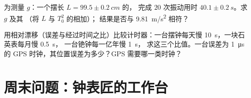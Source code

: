 \begin{exercise}[$\star\star\star$]\label{exo:g12:oscillators-and-time:14}
为测量 $g$：一个摆长 $L = 99.5 \pm \qty{0.2}{cm}$ 的，
完成 $20$ 次振动用时 $40.1 \pm \qty{0.2}{s}$。求 $g$ 及其
（将 $L$ 与 $T_0^2$ 的相加）；
结果是否与 \qty{9.81}{m/s^2} 相符？
\end{exercise}

\begin{exercise}[$\star\star\star$]\label{exo:g12:oscillators-and-time:15}
用相对漂移（误差与经过时间之比）比较计时器：一台摆钟每天慢
\qty{10}{s}，一块石英表每月慢 \qty{0.5}{s}，
一台铯钟每一亿年慢 \qty{1}{s}，
求这三个比值。一台误差为
\qty{1}{\micro s} 的 GPS 时钟，其位置误差为多少？GPS 需要哪一类时钟？
\end{exercise}

\section{周末问题：钟表匠的工作台}


